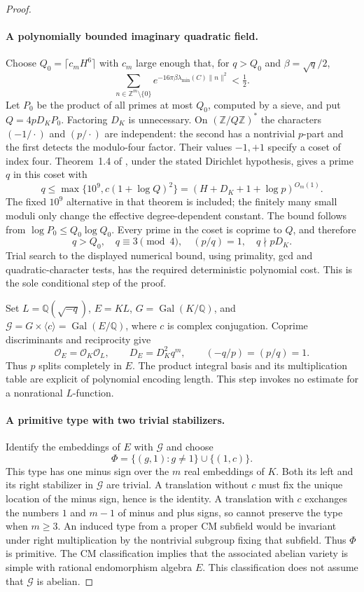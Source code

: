 \documentclass[11pt]{article}
\theoremstyle{definition}
\theoremstyle{remark}
\begin{document}
\begin{proof}
\paragraph{A polynomially bounded imaginary quadratic field.}
Choose $Q_0=\lceil c_mH^6\rceil$ with $c_m$ large enough that, for
$q>Q_0$ and $\beta=\sqrt q/2$,
\[
 \sum_{n\in\mathbb Z^m\setminus\{0\}}
 e^{-16\pi\beta\lambda_{\min}(C)\|n\|^2}<\tfrac12.
\]
Let $P_0$ be the product of all primes at most $Q_0$, computed by a sieve,
and put $Q=4pD_KP_0$.  Factoring $D_K$ is unnecessary.  On
$(\mathbb Z/Q\mathbb Z)^*$ the characters $(-1/\cdot)$ and $(p/\cdot)$
are independent: the second has a nontrivial $p$-part and the first detects
the modulo-four factor.  Their values $-1,+1$ specify a coset of index four.
Theorem~1.4 of \citet[corrected author p.~3]{LLS2015}, under the stated
Dirichlet hypothesis, gives a prime $q$ in this coset with
\[
 q\leq\max\{10^9,c(1+\log Q)^2\}
       =(H+D_K+1+\log p)^{O_m(1)}.
\]
The fixed $10^9$ alternative in that theorem is included; the finitely many
small moduli only change the effective degree-dependent constant.
The bound follows from $\log P_0\leq Q_0\log Q_0$.  Every prime in the
coset is coprime to $Q$, and therefore
\[
 q>Q_0,\quad q\equiv3\pmod4,\quad(p/q)=1,\quad q\nmid pD_K.
\]
Trial search to the displayed numerical bound, using primality, gcd and
quadratic-character tests, has the required deterministic polynomial cost.
This is the sole conditional step of the proof.

Set $L=\mathbb Q(\sqrt{-q})$, $E=KL$, $G=\operatorname{Gal}(K/\mathbb Q)$,
and $\mathcal G=G\times\langle c\rangle=\operatorname{Gal}(E/\mathbb Q)$,
where $c$ is complex conjugation.  Coprime discriminants and reciprocity give
\[
 \mathcal O_E=\mathcal O_K\mathcal O_L,\qquad
 D_E=D_K^2q^m,\qquad (-q/p)=(p/q)=1.
\]
Thus $p$ splits completely in $E$.  The product integral basis and its
multiplication table are explicit of polynomial encoding length.  This
step invokes no estimate for a nonrational $L$-function.

\paragraph{A primitive type with two trivial stabilizers.}
Identify the embeddings of $E$ with $\mathcal G$ and choose
\[
 \Phi=\{(g,1):g\ne1\}\cup\{(1,c)\}.
\]
This type has one minus sign over the $m$ real embeddings of $K$.
Both its left and its right stabilizer in $\mathcal G$ are trivial.  A translation
without $c$ must fix the unique location of the minus sign, hence is the
identity.  A translation with $c$ exchanges the numbers $1$ and $m-1$ of
minus and plus signs, so cannot preserve the type when $m\geq3$.
An induced type from a proper CM subfield would be invariant under right
multiplication by the nontrivial subgroup fixing that subfield.  Thus
$\Phi$ is primitive.  The CM classification
\cite[Proposition 2.1, p.~54]{Milne1999} implies that the associated abelian
variety is simple with rational endomorphism algebra $E$.  This classification
does not assume that $\mathcal G$ is abelian.


\end{proof}
\end{document}
